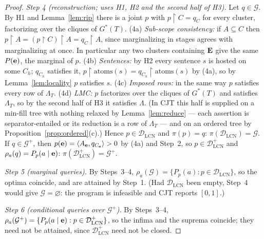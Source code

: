 \documentclass{article} %
\newcommand{\DLCN}{\mathcal{D}_{\mathrm{LCN}}}
\newcommand{\atoms}{\mathrm{atoms}}
\newcommand{\restr}{\!\restriction\!}
\newcommand{\readoff}{\rho}
\begin{document}
\begin{proof}
\emph{Step 4 (reconstruction; uses H1, H2 and the second half of H3).} Let
$q\in\mathcal G$. By H1 and Lemma~\ref{lem:rip} there is a joint $p$ with
$p\restr C=q_C$ for every cluster, factorizing over the cliques of $G^\ast(T)$.
(4a) \emph{Sub-scope consistency:} if $A\subseteq C$ then
$p\restr A=(p\restr C)\restr A=q_C\restr A$, since marginalizing in stages agrees
with marginalizing at once. In particular any two clusters containing $\mathbf{E}$ give
the same $P(\mathbf{e})$, the marginal of $p$. (4b) \emph{Sentences:} by H2 every sentence
$s$ is hosted on some $C_h$; $q_{C_h}$ satisfies it, $p\restr\atoms(s)=q_{C_h}\restr\atoms(s)$
by (4a), so by Lemma~\ref{lem:locality} $p$ satisfies $s$. (4c) \emph{Imposed
rows:} in the same way $p$ satisfies every row of $\Lambda_T$. (4d) \emph{LMC:} $p$
factorizes over the cliques of $G^\ast(T)$ and satisfies $\Lambda_T$, so by the
second half of H3 it satisfies $\Lambda$. (In \textsc{CJT} this half is supplied
on a min-fill tree with nothing relaxed by Lemma~\ref{lem:reduce} --- each
assertion is separator-entailed or its reduction is a row of $\Lambda_T$ --- and on
an ordered tree by Proposition~\ref{prop:ordered}(c).) Hence $p\in\DLCN$ and
$\pi(p)=q$: $\pi(\DLCN)=\mathcal G$. If $q\in\mathcal G^+$, then
$p(\mathbf{e})=\langle A_{\mathbf{e}},q_{C_{\mathbf{e}}}\rangle>0$ by (4a) and Step~2, so $p\in\DLCN^+$
and $\readoff_a(q)=P_p(a\mid\be)$: $\pi(\DLCN^+)=\mathcal G^+$.

\emph{Step 5 (marginal queries).} By Steps~3--4, $\readoff_a(\mathcal G)=\{P_p(a):p\in\DLCN\}$, so the
optima coincide, and are attained by Step~1. (Had $\DLCN$ been empty, Step~4 would
give $\mathcal G=\varnothing$: the program is infeasible and \textsc{CJT} reports
$[0,1]$.)

\emph{Step 6 (conditional queries over $\mathcal G^+$).} By Steps~3--4,
$\readoff_a(\mathcal G^+)=\{P_p(a\mid\be):p\in\DLCN^+\}$, so the infima and the suprema
coincide; they need not be attained, since $\DLCN^+$ need not be closed.


\end{proof}
\end{document}
